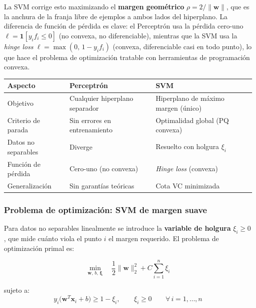 \documentclass[spanish]{article}
\begin{document}
La SVM corrige esto maximizando el \textbf{margen geométrico} $\rho = 2/\|\mathbf{w}\|$, que es la anchura de la franja libre de ejemplos a ambos lados del hiperplano. La diferencia de función de pérdida es clave: el Perceptrón usa la pérdida cero-uno $\ell = \mathbf{1}[y_i f_i \leq 0]$ (no convexa, no diferenciable), mientras que la SVM usa la \textit{hinge loss} $\ell = \max(0,\, 1 - y_i f_i)$ (convexa, diferenciable casi en todo punto), lo que hace el problema de optimización tratable con herramientas de programación convexa.

\begin{center}
\begin{tabular}{lll}
\toprule
\textbf{Aspecto} & \textbf{Perceptrón} & \textbf{SVM} \\
\midrule
Objetivo          & Cualquier hiperplano separador              & Hiperplano de máximo margen (único) \\
Criterio de parada & Sin errores en entrenamiento               & Optimalidad global (PQ convexa) \\
Datos no separables & Diverge                                  & Resuelto con holgura $\xi_i$ \\
Función de pérdida  & Cero-uno (no convexa)                    & \textit{Hinge loss} (convexa) \\
Generalización      & Sin garantías teóricas                   & Cota VC minimizada \\
\bottomrule
\end{tabular}
\end{center}

\subsubsection{Problema de optimización: SVM de margen suave}

Para datos no separables linealmente se introduce la \textbf{variable de holgura} $\xi_i \geq 0$, que mide cuánto viola el punto $i$ el margen requerido. El problema de optimización primal es:

\begin{equation}
\min_{\mathbf{w},\, b,\, \boldsymbol{\xi}} \quad \frac{1}{2}\|\mathbf{w}\|_2^2 + C \sum_{i=1}^{n} \xi_i
\end{equation}

sujeto a:
\begin{equation}
y_i\bigl(\mathbf{w}^T \mathbf{x}_i + b\bigr) \geq 1 - \xi_i, \qquad \xi_i \geq 0 \qquad \forall\, i = 1, \ldots, n
\end{equation}
\end{document}
